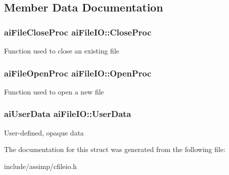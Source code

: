 \subsection{\-Member \-Data \-Documentation}
\hypertarget{structaiFileIO_a7ec702672712b5a02dc49cb17f980a14}{
\subsubsection[{\-Close\-Proc}]{\setlength{\rightskip}{0pt plus 5cm}ai\-File\-Close\-Proc {\bf ai\-File\-I\-O\-::\-Close\-Proc}}}\label{structaiFileIO_a7ec702672712b5a02dc49cb17f980a14}
\-Function used to close an existing file \hypertarget{structaiFileIO_a819d9c7823039294125068d06949a6df}{
\subsubsection[{\-Open\-Proc}]{\setlength{\rightskip}{0pt plus 5cm}ai\-File\-Open\-Proc {\bf ai\-File\-I\-O\-::\-Open\-Proc}}}\label{structaiFileIO_a819d9c7823039294125068d06949a6df}
\-Function used to open a new file \hypertarget{structaiFileIO_a9c62b7f3d70fbb2f41e33ad0b9933139}{
\subsubsection[{\-User\-Data}]{\setlength{\rightskip}{0pt plus 5cm}ai\-User\-Data {\bf ai\-File\-I\-O\-::\-User\-Data}}}\label{structaiFileIO_a9c62b7f3d70fbb2f41e33ad0b9933139}
\-User-\/defined, opaque data 

\-The documentation for this struct was generated from the following file\-:\begin{DoxyCompactItemize}
\item 
include/assimp/cfileio.\-h\end{DoxyCompactItemize}

